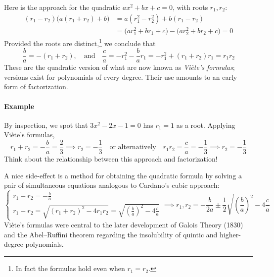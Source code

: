 Here is the approach for the quadratic $ax^2+bx+c=0$, with roots $r_1,r_2$:
\begin{align*}
	(r_1-r_2)\bigl(a(r_1+r_2)+b\bigr) &=a(r_1^2-r_2^2)+b(r_1-r_2)\\
	&=\big(ar_1^2+br_1+c\big)-\big(ar_2^2+br_2+c\big)=0
\end{align*}
Provided the roots are distinct,\footnote{%
	In fact the formulas hold even when $r_1=r_2$.%
}
we conclude that
\[
	\frac ba=-(r_1+r_2),
	\quad\text{and}\quad
	\frac ca=-r_1^2-\frac bar_1=-r_1^2+(r_1+r_2)r_1=r_1r_2
\]
These are the quadratic version of what are now known as \emph{Viète's formulas}; versions exist for polynomials of every degree. Their use amounts to an early form of factorization.


\paragraph{Example}

By inspection, we spot that $3x^2-2x-1=0$ has $r_1=1$ as a root. Applying Viète's formulas,
\[
	r_1+r_2=-\frac ba=\frac 23\implies r_2=-\frac 13
	\quad\text{or alternatively}\quad
	r_1r_2=\frac ca=-\frac 13\implies r_2=-\frac 13
\]
Think about the relationship between this approach and factorization!\medbreak

A nice side-effect is a method for obtaining the quadratic formula by solving a pair of simultaneous equations analogous to Cardano's cubic approach:
\[
	\begin{cases}
		r_1+r_2=-\frac ba\\
		r_1-r_2=\sqrt{(r_1+r_2)^2-4r_1r_2}=\sqrt{\left(\frac ba\right)^2-4\frac ca}
	\end{cases}
	\implies r_1,r_2=-\frac b{2a}\pm\frac 12\sqrt{\left(\frac ba\right)^2-4\frac ca}
\]
Viète's formulas were central to the later development of Galois Theory (1830) and the Abel--Ruffini theorem regarding the insolubility of quintic and higher-degree polynomials.\medbreak


